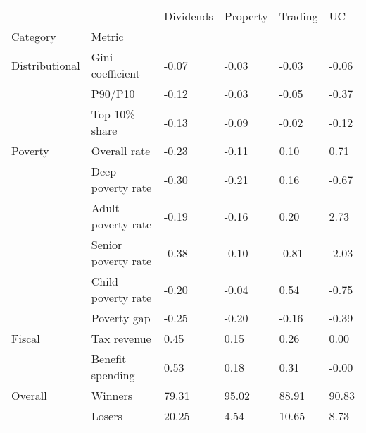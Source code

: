 \begin{tabular}{llllll}
\toprule
        &        & Dividends & Property & Trading &     UC \\
Category & Metric &           &          &         &        \\
\midrule
Distributional & Gini coefficient &     -0.07 &    -0.03 &   -0.03 &  -0.06 \\
        & P90/P10 &     -0.12 &    -0.03 &   -0.05 &  -0.37 \\
        & Top 10\% share &     -0.13 &    -0.09 &   -0.02 &  -0.12 \\
Poverty & Overall rate &     -0.23 &    -0.11 &    0.10 &   0.71 \\
        & Deep poverty rate &     -0.30 &    -0.21 &    0.16 &  -0.67 \\
        & Adult poverty rate &     -0.19 &    -0.16 &    0.20 &   2.73 \\
        & Senior poverty rate &     -0.38 &    -0.10 &   -0.81 &  -2.03 \\
        & Child poverty rate &     -0.20 &    -0.04 &    0.54 &  -0.75 \\
        & Poverty gap &     -0.25 &    -0.20 &   -0.16 &  -0.39 \\
Fiscal & Tax revenue &      0.45 &     0.15 &    0.26 &   0.00 \\
        & Benefit spending &      0.53 &     0.18 &    0.31 &  -0.00 \\
Overall & Winners &     79.31 &    95.02 &   88.91 &  90.83 \\
        & Losers &     20.25 &     4.54 &   10.65 &   8.73 \\
\bottomrule
\end{tabular}
